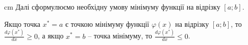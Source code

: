 \documentclass[12pt,a4paper]{article}
\begin{document}
\begin{flushleft}
\parbox{14,5 cm}{ cm Далі сформулюємо необхідну умову мінімуму функції на відрізку $\left[a;b\right]$.}
\end{flushleft}
\begin{theorem4}
Якщо точка ${x}^*= a$ є точкою мінімуму функції $\varphi\left(x\right)$ на відрізку $\left[a;b\right]$, то $\frac{d\varphi\left({x}^*\right)}{dx}\ge 0$, а якщо ${x}^* = b$ – точка мінімуму, то $\frac{d\varphi\left({x}^*\right)}{dx}\le 0$.
\end{theorem4}
\end{document}

